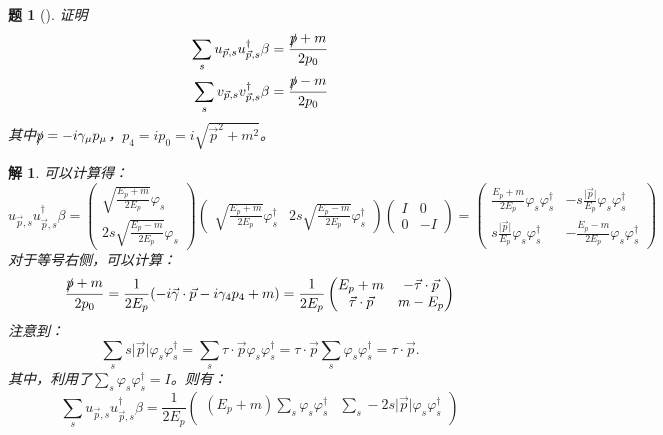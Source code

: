 \documentclass[UTF8,10pt,a4paper]{article}
\theoremstyle{Problem}%
\newtheorem{prob}{题}%
\theoremstyle{Solution}%
\newtheorem*{sol}{解}%
\begin{document}
\begin{prob}[]证明
    \begin{align*}
        \sum_s u_{\vec{p},s} u_{\vec{p},s}^\dagger \beta = \frac{\slashed{p}+m}{2p_0} \\
        \sum_s v_{\vec{p},s} v_{\vec{p},s}^\dagger \beta = \frac{\slashed{p}-m}{2p_0}
    \end{align*}
    其中$\slashed{p} = -i\gamma_\mu p_\mu$，$p_4 = ip_0 = i\sqrt{\vec{p}^2 + m^2}$。
\end{prob}

\begin{sol}
可以计算得：
\[
    u_{\vec{p},s} u_{\vec{p},s}^\dagger \beta = 
    \begin{pmatrix}
        \sqrt{\frac{E_p+m}{2E_p}} \varphi_s \\
        2s\sqrt{\frac{E_p-m}{2E_p}} \varphi_s
    \end{pmatrix}
    \begin{pmatrix}
        \sqrt{\frac{E_p+m}{2E_p}} \varphi_s^\dagger & 2s \sqrt{\frac{E_p-m}{2E_p}} \varphi_s^\dagger
    \end{pmatrix}
    \begin{pmatrix}
        I & 0 \\
        0 & -I
    \end{pmatrix} = 
    \begin{pmatrix}
        \frac{E_p+m}{2E_p}\varphi_s\varphi_s^\dagger & -s\frac{\vert \vec{p} \vert}{E_p} \varphi_s\varphi_s^\dagger \\
        s\frac{\vert \vec{p} \vert}{E_p}\varphi_s\varphi_s^\dagger & -\frac{E_p-m}{2E_p}\varphi_s\varphi_s^\dagger
    \end{pmatrix}
\]
对于等号右侧，可以计算：
\[
    \frac{\slashed{p} + m}{2p_0} = \frac{1}{2E_p} (-i\vec{\gamma} \cdot \vec{p} - i\gamma_4p_4 + m) = \frac{1}{2E_p} \begin{pmatrix}
        E_p + m & -\vec{\tau} \cdot \vec{p} \\
        \vec{\tau} \cdot \vec{p} & m-E_p
    \end{pmatrix}
\]
注意到：
\[
    \sum_s s\vert \vec{p} \vert \varphi_s \varphi_s^\dagger = \sum_s \tau \cdot \vec{p} \varphi_s \varphi_s^\dagger = \tau \cdot \vec{p} \sum_s \varphi_s \varphi_s^\dagger = \tau \cdot \vec{p}.
\]
其中，利用了$\sum_s \varphi_s \varphi_s^\dagger = I$。则有：
\[
    \sum_s u_{\vec{p},s} u_{\vec{p},s}^\dagger \beta = \frac{1}{2E_p} \begin{pmatrix}
        (E_p+m) \sum_s \varphi_s \varphi_s^\dagger & \sum_s -2s \vert \vec{p} \vert \varphi_s \varphi_s^\dagger \\

\end{pmatrix}\]
\end{sol}
\end{document}
